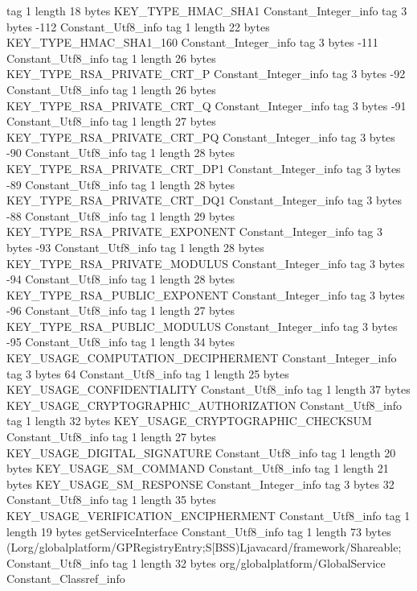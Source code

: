 {{{			tag	1
			length	18
			bytes	KEY_TYPE_HMAC_SHA1
		}
		Constant_Integer_info {
			tag	3
			bytes	-112
		}
		Constant_Utf8_info {
			tag	1
			length	22
			bytes	KEY_TYPE_HMAC_SHA1_160
		}
		Constant_Integer_info {
			tag	3
			bytes	-111
		}
		Constant_Utf8_info {
			tag	1
			length	26
			bytes	KEY_TYPE_RSA_PRIVATE_CRT_P
		}
		Constant_Integer_info {
			tag	3
			bytes	-92
		}
		Constant_Utf8_info {
			tag	1
			length	26
			bytes	KEY_TYPE_RSA_PRIVATE_CRT_Q
		}
		Constant_Integer_info {
			tag	3
			bytes	-91
		}
		Constant_Utf8_info {
			tag	1
			length	27
			bytes	KEY_TYPE_RSA_PRIVATE_CRT_PQ
		}
		Constant_Integer_info {
			tag	3
			bytes	-90
		}
		Constant_Utf8_info {
			tag	1
			length	28
			bytes	KEY_TYPE_RSA_PRIVATE_CRT_DP1
		}
		Constant_Integer_info {
			tag	3
			bytes	-89
		}
		Constant_Utf8_info {
			tag	1
			length	28
			bytes	KEY_TYPE_RSA_PRIVATE_CRT_DQ1
		}
		Constant_Integer_info {
			tag	3
			bytes	-88
		}
		Constant_Utf8_info {
			tag	1
			length	29
			bytes	KEY_TYPE_RSA_PRIVATE_EXPONENT
		}
		Constant_Integer_info {
			tag	3
			bytes	-93
		}
		Constant_Utf8_info {
			tag	1
			length	28
			bytes	KEY_TYPE_RSA_PRIVATE_MODULUS
		}
		Constant_Integer_info {
			tag	3
			bytes	-94
		}
		Constant_Utf8_info {
			tag	1
			length	28
			bytes	KEY_TYPE_RSA_PUBLIC_EXPONENT
		}
		Constant_Integer_info {
			tag	3
			bytes	-96
		}
		Constant_Utf8_info {
			tag	1
			length	27
			bytes	KEY_TYPE_RSA_PUBLIC_MODULUS
		}
		Constant_Integer_info {
			tag	3
			bytes	-95
		}
		Constant_Utf8_info {
			tag	1
			length	34
			bytes	KEY_USAGE_COMPUTATION_DECIPHERMENT
		}
		Constant_Integer_info {
			tag	3
			bytes	64
		}
		Constant_Utf8_info {
			tag	1
			length	25
			bytes	KEY_USAGE_CONFIDENTIALITY
		}
		Constant_Utf8_info {
			tag	1
			length	37
			bytes	KEY_USAGE_CRYPTOGRAPHIC_AUTHORIZATION
		}
		Constant_Utf8_info {
			tag	1
			length	32
			bytes	KEY_USAGE_CRYPTOGRAPHIC_CHECKSUM
		}
		Constant_Utf8_info {
			tag	1
			length	27
			bytes	KEY_USAGE_DIGITAL_SIGNATURE
		}
		Constant_Utf8_info {
			tag	1
			length	20
			bytes	KEY_USAGE_SM_COMMAND
		}
		Constant_Utf8_info {
			tag	1
			length	21
			bytes	KEY_USAGE_SM_RESPONSE
		}
		Constant_Integer_info {
			tag	3
			bytes	32
		}
		Constant_Utf8_info {
			tag	1
			length	35
			bytes	KEY_USAGE_VERIFICATION_ENCIPHERMENT
		}
		Constant_Utf8_info {
			tag	1
			length	19
			bytes	getServiceInterface
		}
		Constant_Utf8_info {
			tag	1
			length	73
			bytes	(Lorg/globalplatform/GPRegistryEntry;S[BSS)Ljavacard/framework/Shareable;
		}
		Constant_Utf8_info {
			tag	1
			length	32
			bytes	org/globalplatform/GlobalService
		}
		Constant_Classref_info {
}}}
